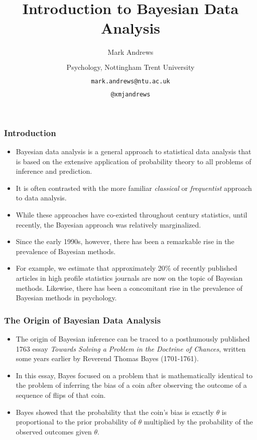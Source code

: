 \documentclass{slides}
\title[Bayesian Inference]{Introduction to Bayesian Data Analysis}
\author[Andrews]{Mark Andrews \\ $\phantom{foo}$ \\ Psychology, Nottingham Trent University \\ $\phantom{foo}$ \\ \texttt{mark.andrews@ntu.ac.uk} \\ $\phantom{foo}$ \\ \faTwitter \texttt{@xmjandrews}}
\date{}
\begin{document}
{
	\begin{frame}
		\titlepage
	\end{frame}
}

\begin{frame}
	\frametitle{Introduction}
	\begin{itemize}

	\item Bayesian data analysis is a general approach to statistical data
		analysis that is based on the extensive application of
		probability theory to all problems of inference and prediction.  

	\item It is often contrasted with the more familiar \emph{classical} or
		\emph{frequentist} approach to data analysis.  

	\item While these approaches have co-existed throughout \nth{20}
		century statistics, until recently, the Bayesian approach was
		relatively marginalized.  

	\item Since the early 1990s, however, there has been a remarkable rise
		in the prevalence of Bayesian methods. 

	\item For example, we estimate that approximately 20\% of recently
		published articles in high profile statistics journals are now
		on the topic of Bayesian methods. Likewise, there has been a
		concomitant rise in the prevalence of Bayesian methods in
		psychology. 
\end{itemize}

\end{frame}


\begin{frame}
	\frametitle{The Origin of Bayesian Data Analysis}
	\begin{itemize}

	\item  The origin of Bayesian inference can be traced to a posthumously published 1763 essay
		\emph{Towards Solving a Problem in the Doctrine of Chances},
		written some years earlier by Reverend Thomas Bayes
		(1701-1761). 

	\item In this essay, Bayes focused on a problem that is mathematically
		identical to the problem of inferring the bias of a coin after
		observing the outcome of a sequence of flips of that coin.  
		
	\item Bayes showed that the probability that the coin's bias is exactly
		$\theta$ is proportional to the prior probability of $\theta$
		multiplied by the probability of the observed outcomes given
		$\theta$.
\end{itemize}
\end{frame}
\end{document}
